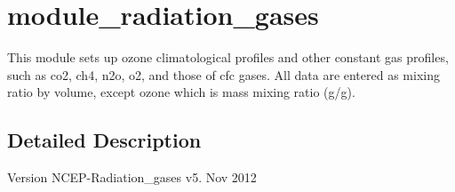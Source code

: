 \hypertarget{group__module__radiation__gases}{}\section{module\+\_\+radiation\+\_\+gases}
\label{group__module__radiation__gases}


This module sets up ozone climatological profiles and other constant gas profiles, such as co2, ch4, n2o, o2, and those of cfc gases. All data are entered as mixing ratio by volume, except ozone which is mass mixing ratio (g/g).  




\subsection{Detailed Description}
\begin{DoxyVersion}{Version}
N\+C\+E\+P-\/\+Radiation\+\_\+gases v5. Nov 2012 
\end{DoxyVersion}

